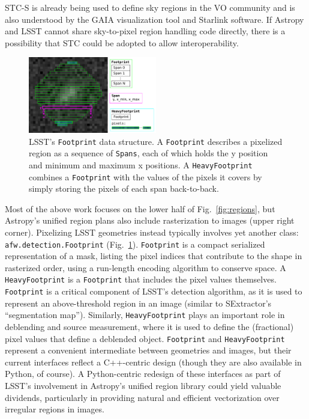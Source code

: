 \documentclass[]{spie}  %
\begin{document}
STC-S is already being used to define sky regions in the VO community and is also understood by the GAIA visualization tool\cite{2009ASPC..411..575D} and Starlink software\cite{2010ASPC..434..213B,2014ASPC..485..391C}.
If Astropy and LSST cannot share sky-to-pixel region handling code directly, there is a possibility that STC could be adopted to allow interoperability.

\begin{figure} [t]
\begin{center}
\includegraphics[width=0.5\textwidth]{footprint}
\end{center}
\caption[footprint]
{\label{fig:footprint}
LSST's \texttt{Footprint} data structure.
A \texttt{Footprint} describes a pixelized region as a sequence of \texttt{Spans}, each of which holds the y position and minimum and maximum x positions.
A \texttt{HeavyFootprint} combines a \texttt{Footprint} with the values of the pixels it covers by simply storing the pixels of each span back-to-back.}
\end{figure}

Most of the above work focuses on the lower half of Fig.~\ref{fig:regions}, but Astropy's unified region plans also include rasterization to images (upper right corner).
Pixelizing LSST geometries instead typically involves yet another class: \texttt{afw.detection.Footprint} (Fig.~\ref{fig:footprint}).
\texttt{Footprint} is a compact serialized representation of a mask, listing the pixel indices that contribute to the shape in rasterized order, using a run-length encoding algorithm to conserve space.
A \texttt{HeavyFootprint} is a \texttt{Footprint} that includes the pixel values themselves.
\texttt{Footprint} is a critical component of LSST's detection algorithm, as it is used to represent an above-threshold region in an image (similar to SExtractor's ``segmentation map'').
Similarly, \texttt{HeavyFootprint} plays an important role in deblending and source measurement, where it is used to define the (fractional) pixel values that define a deblended object.
\texttt{Footprint} and \texttt{HeavyFootprint} represent a convenient intermediate between geometries and images, but their current interfaces reflect a C++-centric design (though they are also available in Python, of course).
A Python-centric redesign of these interfaces as part of LSST's involvement in Astropy's unified region library could yield valuable dividends, particularly in providing natural and efficient vectorization over irregular regions in images.
\end{document}
